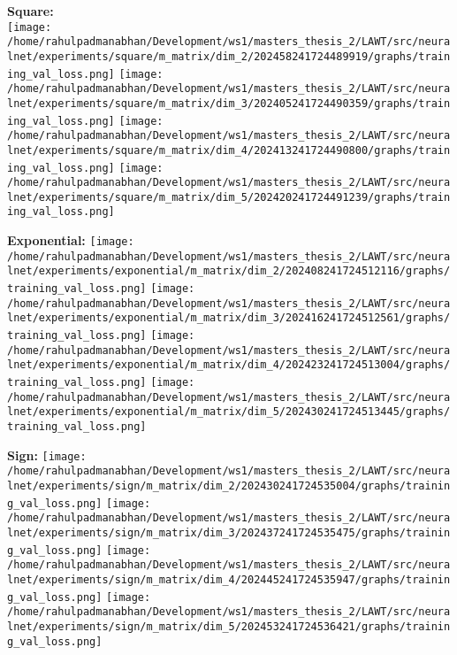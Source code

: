\documentclass{article}
\begin{document}
\textbf{Square:}
\\
\texttt{[image: /home/rahulpadmanabhan/Development/ws1/masters\_thesis\_2/LAWT/src/neuralnet/experiments/square/m\_matrix/dim\_2/202458241724489919/graphs/training\_val\_loss.png]}
\texttt{[image: /home/rahulpadmanabhan/Development/ws1/masters\_thesis\_2/LAWT/src/neuralnet/experiments/square/m\_matrix/dim\_3/202405241724490359/graphs/training\_val\_loss.png]}
\texttt{[image: /home/rahulpadmanabhan/Development/ws1/masters\_thesis\_2/LAWT/src/neuralnet/experiments/square/m\_matrix/dim\_4/202413241724490800/graphs/training\_val\_loss.png]}
\texttt{[image: /home/rahulpadmanabhan/Development/ws1/masters\_thesis\_2/LAWT/src/neuralnet/experiments/square/m\_matrix/dim\_5/202420241724491239/graphs/training\_val\_loss.png]}

\textbf{Exponential:}
\texttt{[image: /home/rahulpadmanabhan/Development/ws1/masters\_thesis\_2/LAWT/src/neuralnet/experiments/exponential/m\_matrix/dim\_2/202408241724512116/graphs/training\_val\_loss.png]}
\texttt{[image: /home/rahulpadmanabhan/Development/ws1/masters\_thesis\_2/LAWT/src/neuralnet/experiments/exponential/m\_matrix/dim\_3/202416241724512561/graphs/training\_val\_loss.png]}
\texttt{[image: /home/rahulpadmanabhan/Development/ws1/masters\_thesis\_2/LAWT/src/neuralnet/experiments/exponential/m\_matrix/dim\_4/202423241724513004/graphs/training\_val\_loss.png]}
\texttt{[image: /home/rahulpadmanabhan/Development/ws1/masters\_thesis\_2/LAWT/src/neuralnet/experiments/exponential/m\_matrix/dim\_5/202430241724513445/graphs/training\_val\_loss.png]}

\textbf{Sign:}
\texttt{[image: /home/rahulpadmanabhan/Development/ws1/masters\_thesis\_2/LAWT/src/neuralnet/experiments/sign/m\_matrix/dim\_2/202430241724535004/graphs/training\_val\_loss.png]}
\texttt{[image: /home/rahulpadmanabhan/Development/ws1/masters\_thesis\_2/LAWT/src/neuralnet/experiments/sign/m\_matrix/dim\_3/202437241724535475/graphs/training\_val\_loss.png]}
\texttt{[image: /home/rahulpadmanabhan/Development/ws1/masters\_thesis\_2/LAWT/src/neuralnet/experiments/sign/m\_matrix/dim\_4/202445241724535947/graphs/training\_val\_loss.png]}
\texttt{[image: /home/rahulpadmanabhan/Development/ws1/masters\_thesis\_2/LAWT/src/neuralnet/experiments/sign/m\_matrix/dim\_5/202453241724536421/graphs/training\_val\_loss.png]}


\pagebreak
\end{document}
